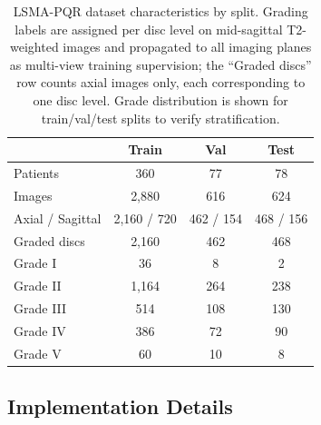 \documentclass[journal]{IEEEtran}
\begin{document}
\begin{table}[htbp]
\centering
\caption{LSMA-PQR dataset characteristics by split. Grading labels are assigned per disc level on mid-sagittal T2-weighted images and propagated to all imaging planes as multi-view training supervision; the ``Graded discs'' row counts axial images only, each corresponding to one disc level. Grade distribution is shown for train/val/test splits to verify stratification.}
\label{tab:dataset}
\begin{tabular}{lccc}
\toprule
& Train & Val & Test \\
\midrule
Patients & 360 & 77 & 78 \\
Images & 2,880 & 616 & 624 \\
Axial / Sagittal & 2,160 / 720 & 462 / 154 & 468 / 156 \\
Graded discs & 2,160 & 462 & 468 \\
\midrule
Grade I & 36 & 8 & 2 \\
Grade II & 1,164 & 264 & 238 \\
Grade III & 514 & 108 & 130 \\
Grade IV & 386 & 72 & 90 \\
Grade V & 60 & 10 & 8 \\
\bottomrule
\end{tabular}
\end{table}

\subsection{Implementation Details}
\label{sec:implementation}
\end{document}
